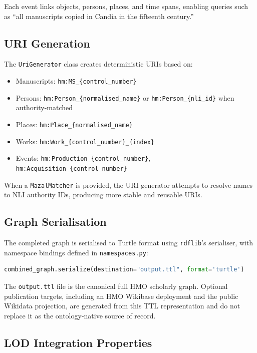 \documentclass[12pt]{article}
\newcommand{\code}[1]{\texttt{#1}}
\begin{document}
Each event links objects, persons, places, and time spans, enabling queries such as ``all manuscripts copied in Candia in the fifteenth century.''

\subsection{URI Generation}

The \code{UriGenerator} class creates deterministic URIs based on:

\begin{itemize}
\item Manuscripts: \code{hm:MS\_\{control\_number\}}
\item Persons: \code{hm:Person\_\{normalised\_name\}} or \code{hm:Person\_\{nli\_id\}} when authority-matched
\item Places: \code{hm:Place\_\{normalised\_name\}}
\item Works: \code{hm:Work\_\{control\_number\}\_\{index\}}
\item Events: \code{hm:Production\_\{control\_number\}}, \code{hm:Acquisition\_\{control\_number\}}
\end{itemize}

When a \code{MazalMatcher} is provided, the URI generator attempts to resolve names to NLI authority IDs, producing more stable and reusable URIs.

\subsection{Graph Serialisation}

The completed graph is serialised to Turtle format using \code{rdflib}'s serialiser, with namespace bindings defined in \code{namespaces.py}:

\begin{lstlisting}[language=Python, caption={Graph serialisation}]
combined_graph.serialize(destination="output.ttl", format='turtle')
\end{lstlisting}

\noindent The \code{output.ttl} file is the canonical full HMO scholarly graph. Optional publication targets, including an HMO Wikibase deployment and the public Wikidata projection, are generated from this TTL representation and do not replace it as the ontology-native source of record.

\subsection{LOD Integration Properties}
\end{document}
